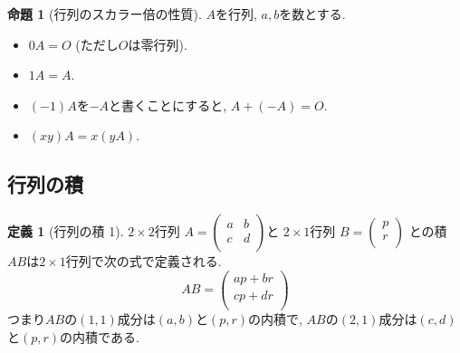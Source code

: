 \documentclass[dvipdfmx,a4paper,11pt]{article}
\theoremstyle{definition}
\newtheorem{prop}[thm]{命題}
\newtheorem{dfn}[thm]{定義}
\begin{document}
 
 
 
 \begin{tcolorbox}[
    colback = white,
    colframe = green!35!black,
    fonttitle = \bfseries,
    breakable = true]
    \begin{prop}[行列のスカラー倍の性質]
$A$を行列, $a,b$を数とする.
 \begin{itemize}
 	\setlength{\parskip}{0cm}
  	\setlength{\itemsep}{0pt} 
 \item $0A =O$ (ただし$O$は零行列).
  \item $1A=A$. 
  \item $(-1)A$を$-A$と書くことにすると, $A + (-A) =O$.　
  \item $(xy) A = x(yA)$.
 \end{itemize}
  \end{prop}
 \end{tcolorbox}
 
 \subsection{行列の積}
 
  \begin{tcolorbox}[
    colback = white,
    colframe = green!35!black,
    fonttitle = \bfseries,
    breakable = true]
    \begin{dfn}[行列の積 1]
    
$2 \times 2$行列
$
A=\begin{pmatrix}
a& b \\
c& d \\
\end{pmatrix}
$と 
$2 \times 1$行列
$
B=
\begin{pmatrix}
p \\
r\\
\end{pmatrix}
$
との積$AB$は$2 \times 1$行列で次の式で定義される.
$$
AB =
\begin{pmatrix}
ap + br \\
cp + dr\\
\end{pmatrix}
$$
つまり$AB$の$(1,1)$成分は$(a,b)$と$(p,r)$の内積で, $AB$の$(2,1)$成分は$(c,d)$と$(p,r)$の内積である. 
  \end{dfn}
 \end{tcolorbox}
 
\end{document}
